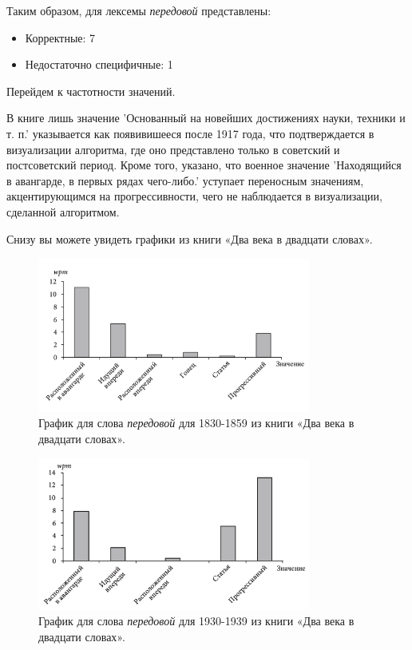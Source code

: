 Таким образом, для лексемы \textit{передовой} представлены:

\begin{itemize}
    \item Корректные: 7
    \item Недостаточно специфичные: 1
\end{itemize}

Перейдем к частотности значений.

В книге лишь значение ’Основанный на новейших достижениях науки, техники и т. п.’
указывается как появивишееся после 1917 года, что подтверждается
в визуализации алгоритма, где оно представлено только в советский и постсоветский период.
Кроме того, указано, что военное значение ’Находящийся в авангарде, в первых рядах чего-либо.’
уступает переносным значениям, акцентирующимся на прогрессивности, чего
не наблюдается в визуализации, сделанной алгоритмом.

Снизу вы можете увидеть графики из книги «Два века в двадцати словах».

\noindent %
\begin{figure}[H]
    \centering %
    \includegraphics[width=0.8\textwidth]{img/book/peredovoj/1830-1859}
    \caption{График для слова \textit{передовой} для 1830-1859 из книги «Два века в двадцати словах».}
\end{figure}

\begin{figure}[H]
    \centering %
    \includegraphics[width=0.8\textwidth]{img/book/peredovoj/1930-1939}
    \caption{График для слова \textit{передовой} для 1930-1939 из книги «Два века в двадцати словах».}
\end{figure}

